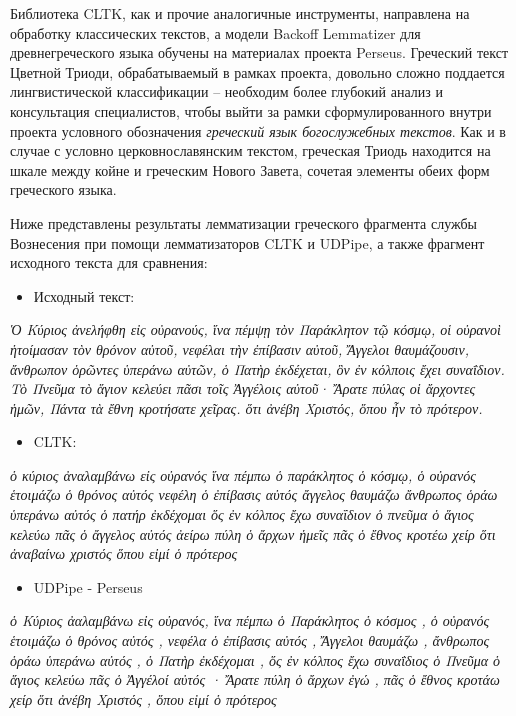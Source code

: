 \documentclass[
  letterpaper,
]{book}
\providecommand{\tightlist}{%
  \setlength{\itemsep}{0pt}\setlength{\parskip}{0pt}}\usepackage{longtable,booktabs,array}
\begin{document}
Библиотека CLTK, как и прочие аналогичные инструменты, направлена на
обработку классических текстов, а модели Backoff Lemmatizer для
древнегреческого языка обучены на материалах проекта Perseus. Греческий
текст Цветной Триоди, обрабатываемый в рамках проекта, довольно сложно
поддается лингвистической классификации -- необходим более глубокий
анализ и консультация специалистов, чтобы выйти за рамки
сформулированного внутри проекта условного обозначения \emph{греческий
язык богослужебных текстов}. Как и в случае с условно церковнославянским
текстом, греческая Триодь находится на шкале между койне и греческим
Нового Завета, сочетая элементы обеих форм греческого языка.

Ниже представлены результаты лемматизации греческого фрагмента службы
Вознесения при помощи лемматизаторов CLTK и UDPipe, а также фрагмент
исходного текста для сравнения:

\begin{itemize}
\tightlist
\item
  Исходный текст:
\end{itemize}

\emph{Ὁ Κύριος ἀνελήφθη εἰς οὐρανούς, ἵνα πέμψῃ τὸν Παράκλητον τῷ κόσμῳ,
οἱ οὐρανοὶ ἡτοίμασαν τὸν θρόνον αὐτοῦ, νεφέλαι τὴν ἐπίβασιν αὐτοῦ,
Ἄγγελοι θαυμάζουσιν, ἄνθρωπον ὁρῶντες ὑπεράνω αὐτῶν, ὁ Πατὴρ ἐκδέχεται,
ὃν ἐν κόλποις ἔχει συναΐδιον. Τὸ Πνεῦμα τὸ ἅγιον κελεύει πᾶσι τοῖς
Ἀγγέλοις αὐτοῦ· Ἄρατε πύλας οἱ ἄρχοντες ἡμῶν, Πάντα τὰ ἔθνη κροτήσατε
χεῖρας. ὅτι ἀνέβη Χριστός, ὅπου ἦν τὸ πρότερον.}

\begin{itemize}
\tightlist
\item
  CLTK:
\end{itemize}

\emph{ὁ κύριος ἀναλαμβάνω εἰς οὐρανός ἵνα πέμπω ὁ παράκλητος ὁ κόσμῳ, ὁ
οὐρανός ἑτοιμάζω ὁ θρόνος αὐτός νεφέλη ὁ ἐπίβασις αὐτός ἄγγελος θαυμάζω
ἄνθρωπος ὁράω ὑπεράνω αὐτός ὁ πατήρ ἐκδέχομαι ὅς ἐν κόλπος ἔχω συναΐδιον
ὁ πνεῦμα ὁ ἅγιος κελεύω πᾶς ὁ ἄγγελος αὐτός ἀείρω πύλη ὁ ἄρχων ἡμεῖς πᾶς
ὁ ἔθνος κροτέω χείρ ὅτι ἀναβαίνω χριστός ὅπου εἰμί ὁ πρότερος}

\begin{itemize}
\tightlist
\item
  UDPipe - Perseus
\end{itemize}

\emph{ὁ Κύριος ἀαλαμβάνω εἰς οὐρανός, ἵνα πέμπω ὁ Παράκλητος ὁ κόσμος ,
ὁ οὐρανός ἑτοιμάζω ὁ θρόνος αὐτός , νεφέλα ὁ ἐπίβασις αὐτός , Ἄγγελοι
θαυμάζω , ἄνθρωπος ὁράω ὑπεράνω αὐτός , ὁ Πατὴρ ἐκδέχομαι , ὅς ἐν κόλπος
ἔχω συναΐδιος ὁ Πνεῦμα ὁ ἅγιος κελεύω πᾶς ὁ Ἀγγέλοί αὐτός · Ἄρατε πύλη ὁ
ἄρχων ἐγώ , πᾶς ὁ ἔθνος κροτάω χείρ ὅτι ἀνέβη Χριστός , ὅπου εἰμί ὁ
πρότερος}
\end{document}
